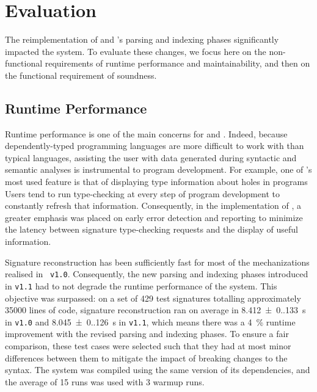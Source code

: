 \section{Evaluation}


The reimplementation of \Beluga and \Harpoon's parsing and indexing phases significantly impacted the system.
To evaluate these changes, we focus here on the non-functional requirements of runtime performance and maintainability, and then on the functional requirement of soundness.

\subsection*{Runtime Performance}


Runtime performance is one of the main concerns for \Beluga and \Harpoon.
Indeed, because dependently-typed programming languages are more difficult to work with than typical languages, assisting the user with data generated during syntactic and semantic analyses is instrumental to program development.
For example, one of \Beluga's most used feature is that of displaying type information about holes in programs
Users tend to run type-checking at every step of program development to constantly refresh that information.
Consequently, in the implementation of \Beluga, a greater emphasis was placed on early error detection and reporting to minimize the latency between signature type-checking requests and the display of useful information.


Signature reconstruction has been sufficiently fast for most of the mechanizations realised in \Beluga~\texttt{v1.0}.
Consequently, the new parsing and indexing phases introduced in \texttt{v1.1} had to not degrade the runtime performance of the system.
This objective was surpassed: on a set of \num{429} test \Beluga signatures totalling approximately \num{35000} lines of code, signature reconstruction ran on average in \SI{8.412(0.133)}{\second} in \texttt{v1.0} and \SI{8.045(0.126)}{\second} in \texttt{v1.1}, which means there was a \SI{4}{\percent} runtime improvement with the revised parsing and indexing phases.
To ensure a fair comparison, these test cases were selected such that they had at most minor differences between them to mitigate the impact of breaking changes to the syntax.
The system was compiled using the same version of its dependencies, and the average of \num{15} runs was used with \num{3} warmup runs.


